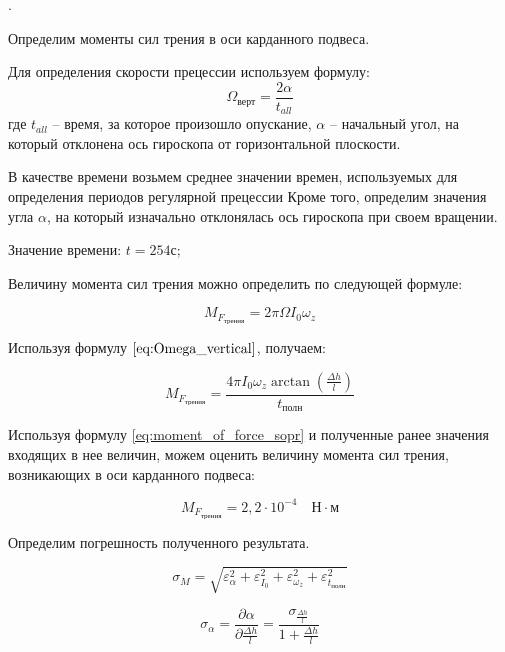\documentclass[a4paper, 12pt]{article}
\newcounter{Points}
\newcommand{\point}{\arabic{Points}. \addtocounter{Points}{1}}
\begin{document}
\point Определим моменты сил трения в оси карданного подвеса. 


Для определения скорости прецессии используем формулу:
\begin{equation}
	\Omega_{\text{верт}} = \frac{2\alpha}{t_{all}}
	\label{eq:Omega_vertical}
\end{equation}
где $t_{all}$ -- время, за которое произошло опускание, $\alpha$ -- начальный угол, на который отклонена ось гироскопа от горизонтальной плоскости.

В качестве времени возьмем среднее значении времен, используемых для определения периодов регулярной прецессии
Кроме того, определим значения угла $\alpha$, на который изначально отклонялась ось гироскопа при своем вращении.

Значение времени: $t = 254 $с;

Величину момента сил трения можно определить по следующей формуле:

\begin{equation}
	M_{F_{\text{трения}}} = 2\pi\Omega I_{0}\omega_{z}
\end{equation}

Используя формулу $\ref{eq:Omega_vertical}$, получаем:

\begin{equation}
	M_{F_{\text{трения}}} = \frac{4\pi I_{0}\omega_{z}\arctan\left(\frac{\Delta h}{l}\right)}{t_{\text{полн}}}
	\label{eq:moment_of_force_sopr}
\end{equation}

Используя формулу \ref{eq:moment_of_force_sopr} и полученные ранее значения входящих в нее величин, можем оценить величину момента сил трения, возникающих в оси карданного подвеса:

\begin{equation}
	M_{F_{\text{трения}}} = 2,2 \cdot 10^{-4} \quad\text{Н}\cdot\text{м}
\end{equation}

Определим погрешность полученного результата. 

\begin{equation}
	\sigma_{M} = \sqrt{\varepsilon_{\alpha}^{2} + \varepsilon_{I_{0}}^{2} + \varepsilon_{\omega_{z}}^{2} + \varepsilon_{t_{\text{полн}}}^{2}}
\end{equation}

\begin{equation}
	\sigma_{\alpha} = \frac{\partial \alpha}{\partial \frac{\Delta h}{l}} = \frac{\sigma_{\frac{\Delta h}{l}}}{1 + \frac{\Delta h}{l}}
\end{equation}
\end{document}
